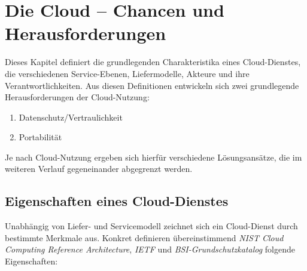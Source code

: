 \chapter{Die Cloud -- Chancen und Herausforderungen}

Dieses Kapitel definiert die grundlegenden Charakteristika eines Cloud-Dienstes, die verschiedenen Service-Ebenen, Liefermodelle, Akteure und ihre Verantwortlichkeiten. Aus diesen Definitionen entwickeln sich zwei grundlegende Herausforderungen der Cloud-Nutzung:

\begin{enumerate}
	\item Datenschutz/Vertraulichkeit
	\item Portabilität
\end{enumerate}

\noindent Je nach Cloud-Nutzung ergeben sich hierfür verschiedene Lösungsansätze, die im weiteren Verlauf gegeneinander abgegrenzt werden.

\section{Eigenschaften eines Cloud-Dienstes}

Unabhängig von Liefer- und Servicemodell zeichnet sich ein Cloud-Dienst durch bestimmte Merkmale aus. Konkret definieren übereinstimmend \emph{NIST Cloud Computing Reference Architecture}, \emph{IETF} und \emph{BSI-Grundschutzkatalog} folgende Eigenschaften:

